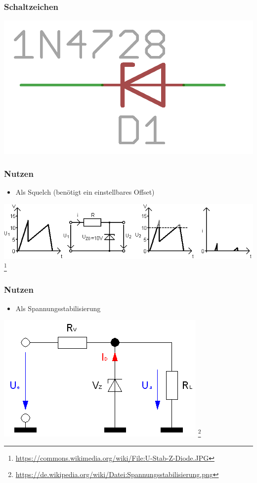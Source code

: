\begin{frame}
    \frametitle{Schaltzeichen}
    \begin{center}
        \includegraphics[width=.8\textwidth]{e12/z-diode.png}
	\end{center}
\end{frame}

\begin{frame}
    \frametitle{Nutzen}
      	\begin{itemize}
			\item Als Squelch (benötigt ein einstellbares Offset)
    \end{itemize}    
    \begin{center}
        \includegraphics[width=.8\textwidth]{e12/U-Stab-Z-Diode.jpg}
        \footnote{\tiny \url{https://commons.wikimedia.org/wiki/File:U-Stab-Z-Diode.JPG}}
	\end{center}
\end{frame}

\begin{frame}
    \frametitle{Nutzen}
      	\begin{itemize}
			\item Als Spannungsstabilisierung
    \end{itemize}    
    \begin{center}
        \includegraphics[width=.8\textwidth]{e12/Spannungsstabilisierung.png}
        \footnote{\tiny \url{https://de.wikipedia.org/wiki/Datei:Spannungsstabilisierung.png}}
	\end{center}
\end{frame}


